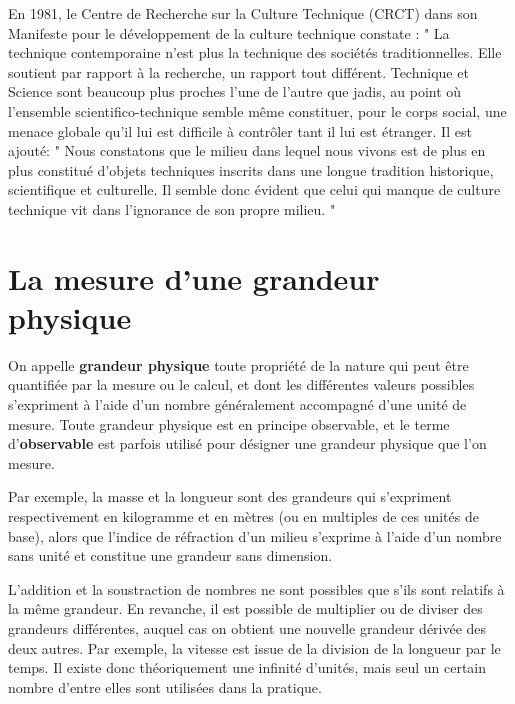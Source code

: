 En 1981, le Centre de Recherche sur la Culture Technique (CRCT) dans son Manifeste pour le développement de la culture technique constate : " La technique contemporaine n'est plus la technique des sociétés traditionnelles. Elle soutient par rapport à la recherche, un rapport tout différent. Technique et Science sont beaucoup plus proches l'une de l'autre que jadis, au point où l'ensemble scientifico-technique semble même constituer, pour le corps social, une menace globale qu'il lui est difficile à contrôler tant il lui est étranger. Il est ajouté: " Nous constatons que le milieu dans lequel nous vivons est de plus en plus constitué d'objets techniques inscrits dans une longue tradition historique, scientifique et culturelle.  Il semble donc évident que celui qui manque de culture technique vit dans l'ignorance de son propre milieu. "

\rm

\section{La mesure d'une grandeur physique}

On appelle \textbf{grandeur physique} toute propriété de la nature qui peut être quantifiée par la mesure ou le calcul, et dont les différentes valeurs possibles s'expriment à l'aide d'un nombre généralement accompagné d'une unité de mesure. Toute grandeur physique est en principe observable, et le terme d'\textbf{observable} est parfois utilisé pour désigner une grandeur physique que l'on mesure.

Par exemple, la masse et la longueur sont des grandeurs qui s'expriment respectivement en kilogramme et en mètres (ou en multiples de ces unités de base), alors que l'indice de réfraction d'un milieu s'exprime à l'aide d'un nombre sans unité et constitue une grandeur sans dimension.

L'addition et la soustraction de nombres ne sont possibles que s'ils sont relatifs à la même grandeur. En revanche, il est possible de multiplier ou de diviser des grandeurs différentes, auquel cas on obtient une nouvelle grandeur dérivée des deux autres. Par exemple, la vitesse est issue de la division de la longueur par le temps. Il existe donc théoriquement une infinité d'unités, mais seul un certain nombre d'entre elles sont utilisées dans la pratique.

